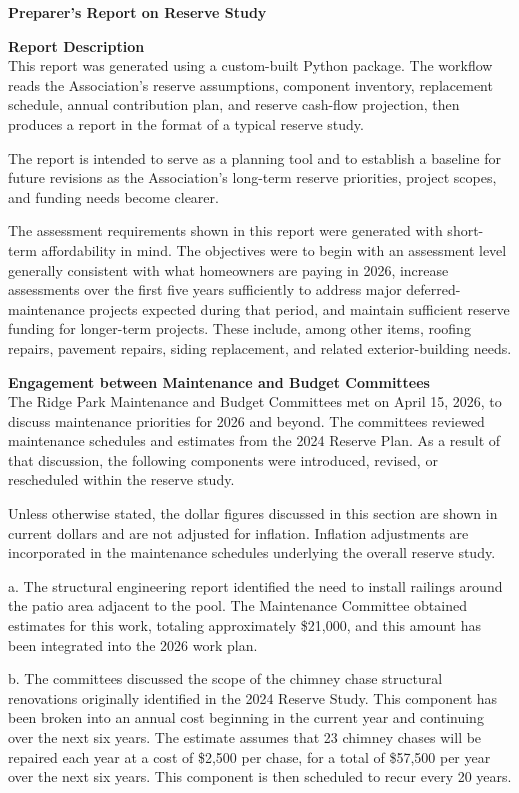 \documentclass[11pt,letterpaper]{article}
\newcommand{\sectionrule}{\par\vspace{0.2em}{\color{linegray}\rule{\linewidth}{0.6pt}}\par\vspace{0.6em}}
\newcommand{\reportsection}[1]{%
  \par\vspace{0.2em}%
  \addcontentsline{toc}{section}{#1}%
  {{\Large\bfseries\color{sectionblue} #1\par}}%
  \sectionrule
}
\begin{document}
\tableofcontents
\newpage

\reportsection{Preparer's Report on Reserve Study}
{\bfseries Report Description}\\
This report was generated using a custom-built Python package. The workflow reads the Association’s reserve assumptions, component inventory, replacement schedule, annual contribution plan, and reserve cash-flow projection, then produces a report in the format of a typical reserve study.

The report is intended to serve as a planning tool and to establish a baseline for future revisions as the Association’s long-term reserve priorities, project scopes, and funding needs become clearer.

The assessment requirements shown in this report were generated with short-term affordability in mind. The objectives were to begin with an assessment level generally consistent with what homeowners are paying in 2026, increase assessments over the first five years sufficiently to address major deferred-maintenance projects expected during that period, and maintain sufficient reserve funding for longer-term projects. These include, among other items, roofing repairs, pavement repairs, siding replacement, and related exterior-building needs.

{\bfseries Engagement between Maintenance and Budget Committees}\\
The Ridge Park Maintenance and Budget Committees met on April 15, 2026, to discuss maintenance priorities for 2026 and beyond. The committees reviewed maintenance schedules and estimates from the 2024 Reserve Plan. As a result of that discussion, the following components were introduced, revised, or rescheduled within the reserve study.

Unless otherwise stated, the dollar figures discussed in this section are shown in current dollars and are not adjusted for inflation. Inflation adjustments are incorporated in the maintenance schedules underlying the overall reserve study.

a. The structural engineering report identified the need to install railings around the patio area adjacent to the pool. The Maintenance Committee obtained estimates for this work, totaling approximately \$21,000, and this amount has been integrated into the 2026 work plan.

b. The committees discussed the scope of the chimney chase structural renovations originally identified in the 2024 Reserve Study. This component has been broken into an annual cost beginning in the current year and continuing over the next six years. The estimate assumes that 23 chimney chases will be repaired each year at a cost of \$2,500 per chase, for a total of \$57,500 per year over the next six years. This component is then scheduled to recur every 20 years.
\end{document}

